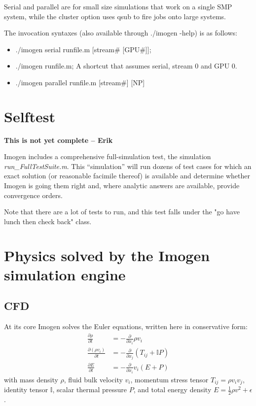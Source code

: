 \documentclass[letterpaper,12pt,twocolumn]{article}
\begin{document}
Serial and parallel are for small size simulations that work on a single SMP system,
while the cluster option uses qsub to fire jobs onto large systems.

The invocation syntaxes (also available through ./imogen -help) is as follows:
\begin{itemize}
\item ./imogen serial runfile.m [stream\# [GPU\#]];
\item ./imogen runfile.m; A shortcut that assumes serial, stream 0 and GPU 0.
\item ./imogen parallel runfile.m [stream\#] [NP]
\end{itemize}

\section{Selftest}

\textbf{This is not yet complete -- Erik}

Imogen includes a comprehensive full-simulation test, the simulation
\textit{run\_FullTestSuite.m}. This ``simulation'' will run dozens of test cases
for which an exact solution (or reasonable facimile thereof) is available
and determine whether Imogen is going them right and, where analytic answers
are available, provide convergence orders.

Note that there are a lot of tests to run, and this test falls under the "go have
lunch then check back" class.

\section{Physics solved by the Imogen simulation engine}

\subsection{CFD}

At its core Imogen solves the Euler equations, written here in conservative form:
\begin{align*}
\frac{\partial \rho}{\partial t} &= -\frac{\partial}{\partial x_i} \rho v_i \\
\frac{\partial (\rho v_i)}{\partial t} &= -\frac{\partial}{\partial x_j} (T_{ij} + \mathbb{I} P) \\
\frac{\partial E}{\partial t} &= -\frac{\partial}{\partial x_i} v_i (E + P)
\end{align*}
with mass density $\rho$, fluid bulk velocity $v_i$, momentum stress tensor
$T_{ij} = \rho v_i v_j$, identity tensor $\mathbb{I}$, scalar thermal pressure $P$,
and total energy density $E = \frac{1}{2} \rho v^2 + \epsilon$.
\end{document}
